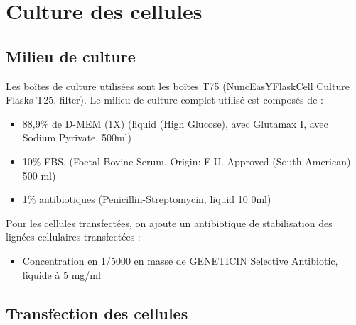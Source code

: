 \chapter{Culture des cellules}
		\section{Milieu de culture}		
		\label{chap_annexe:milieu_culture}
		Les boîtes de culture utilisées sont les boîtes T75 (Nunc\texttrademark EasYFlask\texttrademark Cell Culture Flasks T25, filter).
		Le milieu de culture complet utilisé est composés de :
				 \begin{itemize}
				 \item 88,9\% de D-MEM (1X) (liquid (High Glucose), avec Glutamax I, avec Sodium Pyrivate, 500ml)
				 \item 10\% FBS, (Foetal Bovine Serum, Origin: E.U. Approved (South American) 500 ml)
				 \item 1\% antibiotiques (Penicillin-Streptomycin, liquid 10 0ml)				 			 
				 \end{itemize}	
				 Pour les cellules transfectées, on ajoute un antibiotique de stabilisation des lignées cellulaires transfectées :
				 \begin{itemize}
				 	\item Concentration en 1/5000 en masse de GENETICIN Selective Antibiotic, liquide à 5 mg/ml  	
				 \end{itemize}
		\section{Transfection des cellules}
		\label{chap_annexe:transfection_cellule}
